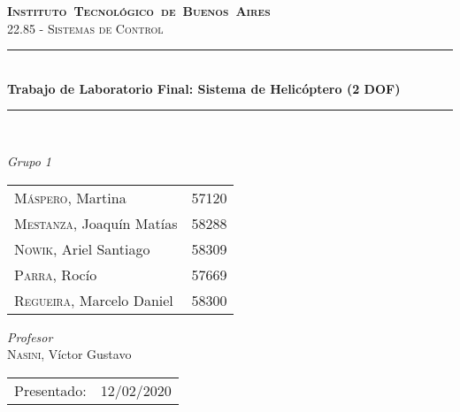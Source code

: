 \begin{titlepage}
\newcommand{\HRule}{\rule{\linewidth}{0.5mm}}
\center
\mbox{\textsc{\LARGE \bfseries {Instituto Tecnol\'ogico de Buenos Aires}}}\\[1.5cm]
\textsc{\Large 22.85 - Sistemas de Control}\\[0.5cm]


\HRule \\[0.6cm]
{ \Huge \bfseries Trabajo de Laboratorio Final: Sistema de Helicóptero (2 DOF)}\\[0.4cm] %
\HRule \\[1.5cm]


{\large

\emph{Grupo 1}\\
\vspace{3px}

\begin{tabular}{lr} 	
\textsc{M\'aspero}, Martina  & 57120 \\
\textsc{Mestanza}, Joaqu\'in Mat\'ias  & 58288 \\
\textsc{Nowik}, Ariel Santiago  & 58309 \\
\textsc{Parra}, Roc\'io  & 57669 \\
\textsc{Regueira}, Marcelo Daniel  & 58300 \\

\end{tabular}

\vspace{20px}

\emph{Profesor}\\
\vspace{3px}
\textsc{Nasini}, V\'ictor Gustavo\\ 	
\vspace{100px}

\begin{tabular}{ll}

Presentado: & 12/02/2020\\

\end{tabular}

}

\vfill

\end{titlepage}